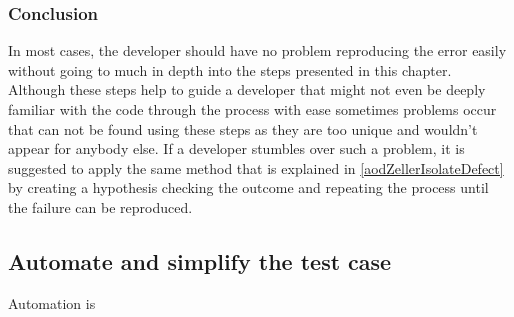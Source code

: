 \subsubsection{Conclusion}
In most cases, the developer should have no problem reproducing the error easily without going to much in depth into the steps presented in this chapter. Although these steps help to guide a developer that might not even be deeply familiar with the code through the process with ease sometimes problems occur that can not be found using these steps as they are too unique and wouldn't appear for anybody else. If a developer stumbles over such a problem, it is suggested to apply the same method that is explained in \ref{aodZellerIsolateDefect} by creating a hypothesis checking the outcome and repeating the process until the failure can be reproduced.

\subsection{Automate and simplify the test case}
Automation is
